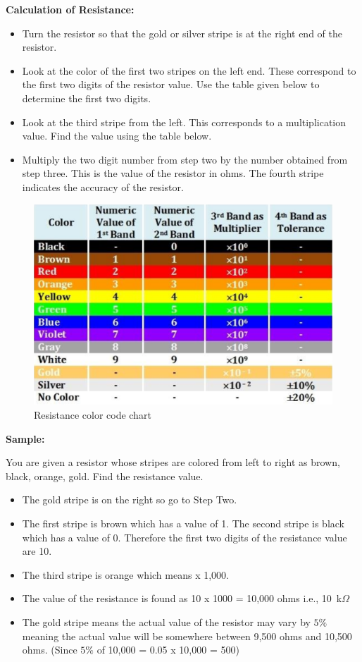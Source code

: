 \documentclass[9pt]{scrreprt}
\begin{document}
\textbf{Calculation of Resistance:}
\begin{itemize}
\item Turn the resistor so that the gold or silver stripe is at the right end of the resistor.
\item Look at the color of the first two stripes on the left end. These correspond to the first two digits
of the resistor value. Use the table given below to determine the first two digits.
\item Look at the third stripe from the left. This corresponds to a multiplication value. Find the value
using the table below.
\item Multiply the two digit number from step two by the number obtained from step three. This is the
value of the resistor in ohms. The fourth stripe indicates the accuracy of the resistor.
\end{itemize}

\begin{figure}[H]
	\centering
	\includegraphics[width=0.7\linewidth]{logos/Resistance_colorcode.png}
	\caption{Resistance color code chart}
	\label{fig:Resistance_colorcode}
\end{figure}

\textbf{Sample:}


You are given a resistor whose stripes are colored from left to right as brown, black, orange, gold. Find
the resistance value.
\begin{itemize}
\item The gold stripe is on the right so go to Step Two.
\item The first stripe is brown which has a value of 1. The second stripe is black which has a value of 0.
Therefore the first two digits of the resistance value are 10.
\item The third stripe is orange which means x 1,000.
\item The value of the resistance is found as 10 x 1000 = 10,000 ohms i.e., 10~k$\Omega$ 
\item The gold stripe means the actual value of the resistor may vary by $5\%$ meaning the actual value
will be somewhere between 9,500 ohms and 10,500 ohms. (Since $5\%$ of 10,000 = 0.05 x 10,000 = 500)
\end{itemize}
\end{document}
